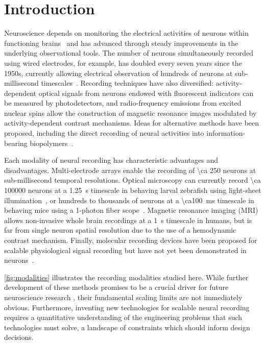 \section{Introduction}
Neuroscience depends on monitoring the electrical activities of neurons within functioning brains~\cite{alivisatos2012brain, bansal2012decoding} and has advanced through steady improvements in the underlying observational tools. The number of neurons simultaneously recorded using wired electrodes, for example, has doubled every seven years since the 1950s, currently allowing electrical observation of hundreds of neurons at sub-millisecond timescales~\cite{stevenson11}. Recording techniques have also diversified: activity-dependent optical signals from neurons endowed with fluorescent indicators can be measured by photodetectors, and radio-frequency emissions from excited nuclear spins allow the construction of magnetic resonance images modulated by activity-dependent contrast mechanisms.
Ideas for alternative methods have been proposed, including the direct recording of neural activities into information-bearing biopolymers~\cite{zamft12,glaser13,kording11a}.

Each modality of neural recording has characteristic advantages and disadvantages.
Multi-electrode arrays enable the recording of \num{\ca 250} neurons at sub-millisecond temporal resolutions.
Optical microscopy can currently record \num{\ca 100000} neurons at a \SI{1.25}{\second} timescale in behaving larval zebrafish using light-sheet illumination~\cite{ahrens13}, or hundreds to thousands of neurons at a \SI{\ca100}{\milli\second} timescale in behaving mice using a 1-photon fiber scope~\cite{ziv13}.
Magnetic resonance imaging (MRI) allows non-invasive whole brain recordings at a \SI{1}{\second} timescale in humans, but is far from single neuron spatial resolution due to the use of a hemodynamic contrast mechanism.
Finally, molecular recording devices have been proposed for scalable physiological signal recording but have not yet been demonstrated in neurons~\cite{zamft12,glaser13,kording11a}.

\autoref{fig:modalities} illustrates the recording modalities studied here.
While further development of these methods promises to be a crucial driver for future neuroscience research \cite{NeuroscienceThinksBigAndCollaboratively}, their fundamental scaling limits are not immediately obvious. Furthermore, inventing new technologies for scalable neural recording requires a quantitative understanding of the engineering problems that such technologies must solve, a landscape of constraints which should inform design decisions.

